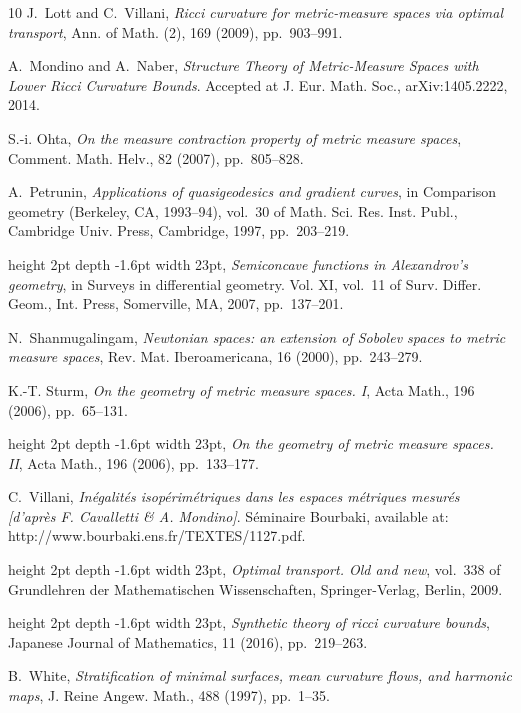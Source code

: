 \documentclass[reqno,11pt]{article}
\numberwithin{equation}{section}
\begin{document}
\begin{thebibliography}{10}
{\sc J.~Lott and C.~Villani}, {\em Ricci curvature for metric-measure spaces
  via optimal transport}, Ann. of Math. (2), 169 (2009), pp.~903--991.

{\sc A.~Mondino and A.~Naber}, {\em Structure {T}heory of {M}etric-{M}easure
  {S}paces with {L}ower {R}icci {C}urvature {B}ounds}.
\newblock Accepted at J. Eur. Math. Soc., arXiv:1405.2222, 2014.

{\sc S.-i. Ohta}, {\em On the measure contraction property of metric measure
  spaces}, Comment. Math. Helv., 82 (2007), pp.~805--828.

{\sc A.~Petrunin}, {\em Applications of quasigeodesics and gradient curves}, in
  Comparison geometry ({B}erkeley, {CA}, 1993--94), vol.~30 of Math. Sci. Res.
  Inst. Publ., Cambridge Univ. Press, Cambridge, 1997, pp.~203--219.

\leavevmode\vrule height 2pt depth -1.6pt width 23pt, {\em Semiconcave
  functions in {A}lexandrov's geometry}, in Surveys in differential geometry.
  {V}ol. {XI}, vol.~11 of Surv. Differ. Geom., Int. Press, Somerville, MA,
  2007, pp.~137--201.

{\sc N.~Shanmugalingam}, {\em Newtonian spaces: an extension of {S}obolev
  spaces to metric measure spaces}, Rev. Mat. Iberoamericana, 16 (2000),
  pp.~243--279.

{\sc K.-T. Sturm}, {\em On the geometry of metric measure spaces. {I}}, Acta
  Math., 196 (2006), pp.~65--131.

\leavevmode\vrule height 2pt depth -1.6pt width 23pt, {\em On the geometry of
  metric measure spaces. {II}}, Acta Math., 196 (2006), pp.~133--177.

{\sc C.~Villani}, {\em {I}n\'egalit\'es isop\'erim\'etriques dans les espaces
  m\'etriques mesur\'es [d'apr\`es {F}. {C}avalletti \& {A}. {M}ondino]}.
\newblock S\'eminaire {B}ourbaki, available at:
  http://www.bourbaki.ens.fr/TEXTES/1127.pdf.

\leavevmode\vrule height 2pt depth -1.6pt width 23pt, {\em Optimal transport.
  Old and new}, vol.~338 of Grundlehren der Mathematischen Wissenschaften,
  Springer-Verlag, Berlin, 2009.

\leavevmode\vrule height 2pt depth -1.6pt width 23pt, {\em Synthetic theory of
  ricci curvature bounds}, Japanese Journal of Mathematics, 11 (2016),
  pp.~219--263.

{\sc B.~White}, {\em Stratification of minimal surfaces, mean curvature flows,
  and harmonic maps}, J. Reine Angew. Math., 488 (1997), pp.~1--35.

\end{thebibliography}

  
\end{document}
